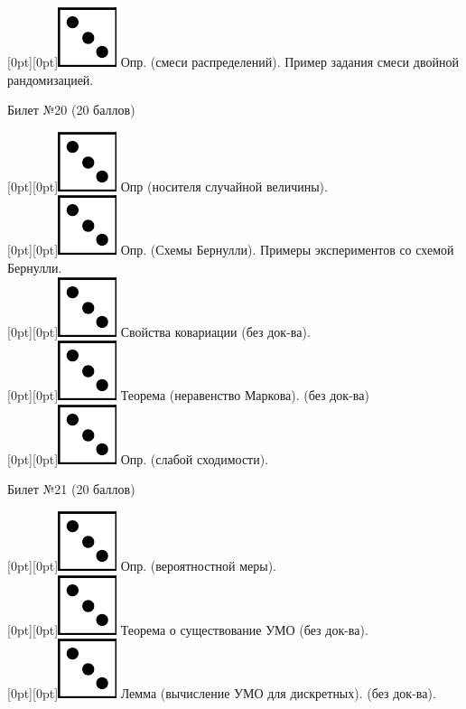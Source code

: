 \documentclass[preview]{standalone}
\begin{document}
\raisebox{-1pt}[0pt][0pt]{\includegraphics[width=0.02\linewidth]{3.png}}  Опр. (смеси распределений). Пример задания смеси двойной рандомизацией. \\
\begin{center} {\Large Билет №20 (20 баллов)} \end{center}
\raisebox{-1pt}[0pt][0pt]{\includegraphics[width=0.02\linewidth]{3.png}} Опр (носителя случайной величины). \\
\raisebox{-1pt}[0pt][0pt]{\includegraphics[width=0.02\linewidth]{3.png}} Опр. (Схемы Бернулли). Примеры экспериментов со схемой Бернулли. \\
\raisebox{-1pt}[0pt][0pt]{\includegraphics[width=0.02\linewidth]{3.png}} Свойства ковариации (без док-ва). \\
\raisebox{-1pt}[0pt][0pt]{\includegraphics[width=0.02\linewidth]{3.png}} Теорема (неравенство Маркова). (без док-ва) \\
\raisebox{-1pt}[0pt][0pt]{\includegraphics[width=0.02\linewidth]{3.png}} Опр. (слабой сходимости). \\
\begin{center} {\Large Билет №21 (20 баллов)} \end{center}
\raisebox{-1pt}[0pt][0pt]{\includegraphics[width=0.02\linewidth]{3.png}} Опр. (вероятностной меры). \\
\raisebox{-1pt}[0pt][0pt]{\includegraphics[width=0.02\linewidth]{3.png}} Теорема о существование УМО (без док-ва). \\
\raisebox{-1pt}[0pt][0pt]{\includegraphics[width=0.02\linewidth]{3.png}} Лемма (вычисление УМО для дискретных). (без док-ва). \\
\end{document}
